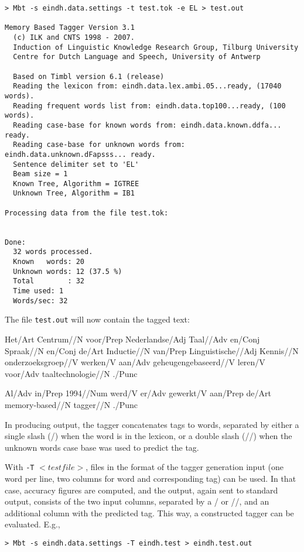 \documentclass{report}
\begin{document}
{\small
\begin{verbatim}
> Mbt -s eindh.data.settings -t test.tok -e EL > test.out

Memory Based Tagger Version 3.1
  (c) ILK and CNTS 1998 - 2007.
  Induction of Linguistic Knowledge Research Group, Tilburg University
  Centre for Dutch Language and Speech, University of Antwerp

  Based on Timbl version 6.1 (release)
  Reading the lexicon from: eindh.data.lex.ambi.05...ready, (17040 words).
  Reading frequent words list from: eindh.data.top100...ready, (100 words).
  Reading case-base for known words from: eindh.data.known.ddfa... ready.
  Reading case-base for unknown words from: eindh.data.unknown.dFapsss... ready.
  Sentence delimiter set to 'EL'
  Beam size = 1
  Known Tree, Algorithm = IGTREE
  Unknown Tree, Algorithm = IB1

Processing data from the file test.tok:


Done:
  32 words processed.
  Known   words: 20
  Unknown words: 12 (37.5 %)
  Total        : 32
  Time used: 1
  Words/sec: 32
\end{verbatim}
}

The file {\tt test.out} will now contain the tagged text:

{\small 

Het/Art Centrum//N voor/Prep Nederlandse/Adj Taal//Adv en/Conj
Spraak//N en/Conj de/Art Inductie//N van/Prep Linguistische//Adj
Kennis//N onderzoeksgroep//V werken/V aan/Adv geheugengebaseerd//V
leren/V voor/Adv taaltechnologie//N ./Punc

Al/Adv in/Prep 1994//Num werd/V er/Adv gewerkt/V aan/Prep de/Art memory-based//N tagger//N ./Punc  
}

In producing output, the tagger concatenates tags to words,
separated by either a single slash (/) when the word is in the
lexicon, or a double slash (//) when the unknown words case base was
used to predict the tag.

With {\tt -T} $<testfile>$, files in the format of the tagger generation
input (one word per line, two columns for word and corresponding tag)
can be used. In that case, accuracy figures are computed, and the
output, again sent to standard output, consists of the two input
columns, separated by a / or //, and an additional column with the
predicted tag. This way, a constructed tagger can be evaluated. E.g., 

{\small
\begin{verbatim}
> Mbt -s eindh.data.settings -T eindh.test > eindh.test.out
\end{verbatim}
}
\end{document}
